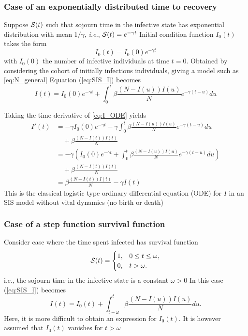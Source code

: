 \documentclass[aspectratio=169]{beamer}
\begin{document}
\begin{frame}\frametitle{Case of an exponentially distributed time to recovery}
Suppose $\S(t)$ such that sojourn time in the infective
state has exponential distribution with mean $1/\gamma$,
\textit{i.e.}, $\S(t)=e^{-\gamma t}$
\vfill
Initial condition function $I_0(t)$ takes the form
\[
I_0(t)=I_0(0)e^{-\gamma t}
\]
with $I_0(0)$ the number of infective individuals at time $t=0$. Obtained by considering the cohort of initially infectious individuals, giving a
model such as \eqref{eq:N_general}
\vfill
Equation (\ref{eq:SIS_I}) becomes
\begin{equation}\label{eq:I_ODE}
I(t)=I_0(0)e^{-\gamma t}+\int_0^t \beta\frac{(N-I(u))I(u)}{N} e^{-\gamma
(t-u)}du
\end{equation}
\end{frame}

\begin{frame}
Taking the time derivative of \eqref{eq:I_ODE} yields
\begin{align*}
I'(t) &= -\gamma I_0(0)e^{-\gamma t}-\gamma\int_0^t
\beta\frac{(N-I(u))I(u)}{N}e^{-\gamma(t-u)}du \\
&\quad +\beta \frac{(N-I(t))I(t)}{N} \\
&= -\gamma\left(I_0(0)e^{-\gamma t}+
\int_0^t \beta\frac{(N-I(u))I(u)}{N}e^{-\gamma(t-u)}du\right) \\
&\quad +\beta \frac{(N-I(t))I(t)}{N} \\
&= \beta \frac{(N-I(t))I(t)}{N}-\gamma I(t)
\end{align*}
\vfill
This is the classical logistic type ordinary differential equation (ODE) for $I$ in an SIS model without vital dynamics (no birth or death)
\end{frame}



\begin{frame}\frametitle{Case of a step function survival function}
Consider case where the time spent infected has survival function 
\[
\S(t)=\begin{cases}
1, & 0\leq t\leq\omega,\\
0, & t>\omega.
\end{cases}
\]
i.e., the sojourn time in the infective state is a constant
$\omega>0$
\vfill
In this case (\ref{eq:SIS_I}) becomes
\begin{equation}\label{eq:I_DDE}
I(t)=I_0(t)+\int_{t-\omega}^t \beta\frac{(N-I(u))I(u)}{N} du.
\end{equation}
Here, it is more difficult to obtain an expression for $I_0(t)$. It is however assumed that $I_0(t)$ vanishes for $t>\omega$
\end{frame}
\end{document}
